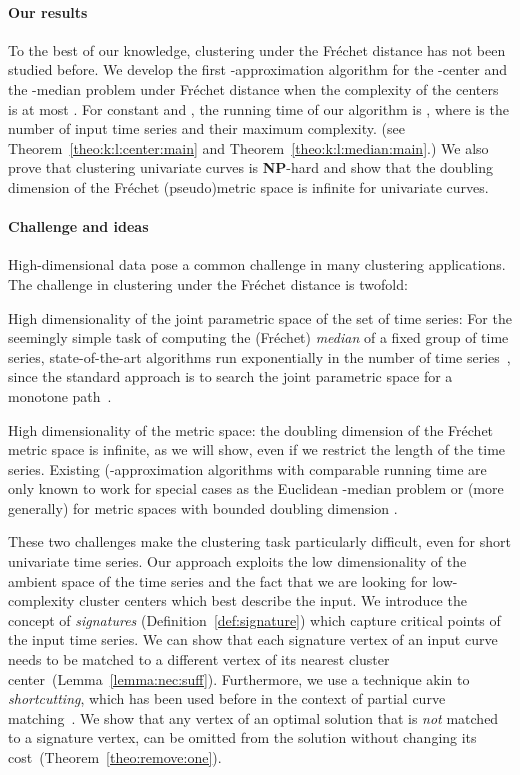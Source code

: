 \documentclass[11pt, letter]{article}
\newcommand{\thmref}[1]{Theorem~\ref{theo:#1}}
\newcommand{\lemref}[1]{Lemma~\ref{lemma:#1}}
\newcommand{\defref}[1]{Definition~\ref{def:#1}}
\newcommand{\NP}{\textbf{NP}} \newcommand{\spine}{\textsl{spine}}
\newcommand{\Frechet}{Fr\'echet\xspace}
\begin{document}
\paragraph{Our results} 

To the best of our knowledge, clustering under the \Frechet{} distance has not been studied before. 
We develop the first -approximation algorithm for the -center and the -median problem 
under \Frechet{} distance when the complexity of the centers is at most . For constant  and , the running time of our algorithm is , where  is the number of input 
time series and  their maximum complexity. (see \thmref{k:l:center:main} and \thmref{k:l:median:main}.)
We also prove that clustering univariate curves is \NP-hard and show that the doubling dimension of the 
\Frechet{} (pseudo)metric space is infinite for univariate curves.

\paragraph{Challenge and ideas}
High-dimensional data pose a common challenge in many clustering applications.
The challenge in clustering under the \Frechet distance is twofold:
\begin{compactenum}[(A)]
\item High dimensionality of the joint parametric
space of the set of time series:  For the seemingly simple task of computing the (\Frechet{})
\emph{median} of a fixed group of time series, state-of-the-art algorithms run
exponentially in the number of time series~\cite{ahn2015middle, hr-fdre-14}, since the standard
approach is to search the joint parametric space for a monotone 
path~\cite{ag-cfdbt-95, akw-mpcfd-10,buchin2012four, bbw-eapcm-09, feldman2012gps, GudVahr12,
hr-fdre-14, mssz-fdsl-2011}. 
\item High dimensionality of the metric space: the doubling dimension of the \Frechet metric space is
infinite, as we will show, even if we restrict the length of the time series.
Existing (-approximation algorithms \cite{abs-cm-10, kumar2010lineartime} with comparable running time are only known to work for special cases
as the Euclidean -median problem or (more generally) for metric spaces with bounded doubling dimension 
\cite{abs-cm-10}.
\end{compactenum}
These two challenges make the clustering task particularly difficult, even for short univariate time
series. Our approach exploits the low dimensionality of the ambient space of the
time series and the fact that we are looking for low-complexity cluster 
centers which best describe the input. 
We introduce the concept of \emph{signatures} (\defref{signature}) which capture critical points of
the input time series. We can show that each signature vertex of an input curve
needs to be matched to a different vertex of its nearest cluster center~(\lemref{nec:suff}).  
Furthermore, we use a technique akin to \emph{shortcutting}, which has been used
before in the context of partial curve matching~\cite{bbw-eapcm-09, dh-jydfd-13}.
We show that any vertex of an optimal solution that is \emph{not} matched to a
signature vertex, can be omitted from the solution without changing its
cost~(\thmref{remove:one}).
\end{document}

